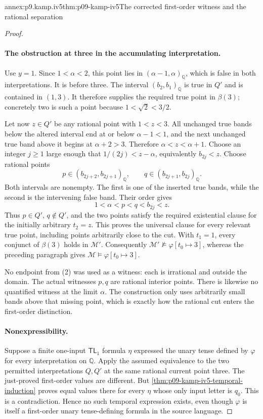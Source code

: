 \begin{annexitem}{annex:p9.kamp.iv5}{thm:p09-kamp-iv5}{The corrected first-order witness and the rational separation}
\begin{proof}
\paragraph{The obstruction at three in the accumulating interpretation.}
Use \(y=1\). Since \(1<\alpha<2\), this point
lies in \((\alpha-1,\alpha)_{\mathbb Q}\),
which is false in both interpretations. It is before
three. The interval \((b_2,b_1)_{\mathbb Q}\)
is true in \(Q'\) and is contained in \((1,3)\).
It therefore supplies the required true point in
\(\beta(3)\); concretely two is such a point
because \(1<\sqrt2<3/2\).

Let now \(z\in Q'\) be any rational point with
\(1<z<3\). All unchanged true bands below the
altered interval end at or below \(\alpha-1<1\),
and the next unchanged true band above it begins
at \(\alpha+2>3\). Therefore
\(\alpha<z<\alpha+1\). Choose an integer
\(j\geq1\) large enough that
\(1/(2j)<z-\alpha\), equivalently \(b_{2j}<z\).
Choose rational points
\[
             p\in(b_{2j+2},b_{2j+1})_{\mathbb Q},
       \qquad q\in(b_{2j+1},b_{2j})_{\mathbb Q}.
 \tag{2}
\]
Both intervals are nonempty. The first is one of
the inserted true bands, while the second is the
intervening false band. Their order gives
\[
                       1<\alpha<p<q<b_{2j}<z.
\]
Thus \(p\in Q'\), \(q\notin Q'\), and
the two points satisfy the required existential
clause for the initially arbitrary \(t_2=z\).
This proves the universal clause for every relevant
true point, including points arbitrarily close to
the cut. With \(t_1=1\), every conjunct of
\(\beta(3)\) holds in \(\mathcal M'\).
Consequently \(\mathcal M'\not\models
\varphi[t_0\mapsto3]\), whereas the preceding paragraph
gives \(\mathcal M\models\varphi[t_0\mapsto3]\).

No endpoint from (2) was used as a witness: each
is irrational and outside the domain. The actual
witnesses \(p,q\) are rational interior points.
There is likewise no quantified witness at the
limit \(\alpha\). The construction only uses
arbitrarily small bands above that missing point,
which is exactly how the rational cut enters the
first-order distinction.

\paragraph{Nonexpressibility.}
Suppose a finite one-input \(\mathsf{TL}_1\)
formula \(\eta\) expressed the unary tense
defined by \(\varphi\) for every interpretation
on \(\mathbb Q\). Apply the assumed equivalence
to the two permitted interpretations \(Q,Q'\)
at the same rational current point three.
The just-proved first-order values are different.
But \cref{thm:p09-kamp-iv5-temporal-induction}
proves equal values there for every \(\eta\)
whose only input letter is \(q_0\). This is a
contradiction. Hence no such temporal expression
exists, even though \(\varphi\) is itself a
first-order unary tense-defining formula in the
source language.


\end{proof}
\end{annexitem}
